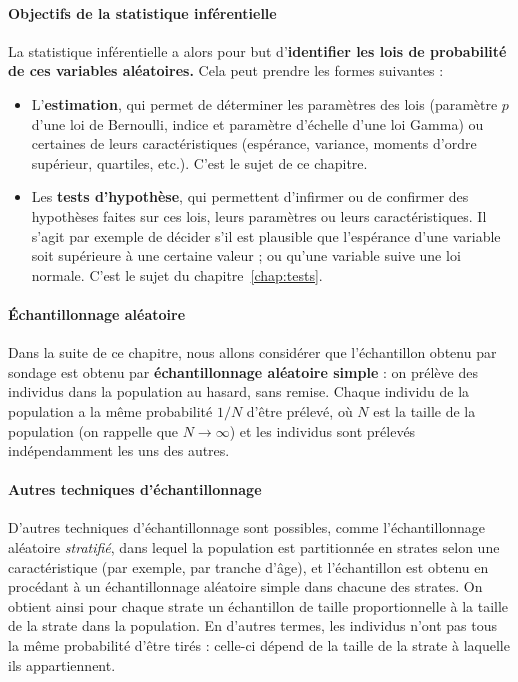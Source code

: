 \paragraph{Objectifs de la statistique inférentielle} La statistique
inférentielle a alors pour but d'\textbf{identifier les lois de probabilité de ces
  variables aléatoires.} Cela peut prendre les
formes suivantes :
\begin{itemize}
\item L'\textbf{estimation}, qui permet de déterminer les paramètres des lois (paramètre
  $p$ d'une loi de Bernoulli, indice et paramètre d'échelle d'une loi Gamma) ou
  certaines de leurs caractéristiques (espérance, variance, moments d'ordre
  supérieur, quartiles, etc.). C'est le sujet de ce chapitre.
\item Les \textbf{tests d'hypothèse}, qui permettent d'infirmer ou de confirmer des
  hypothèses faites sur ces lois, leurs paramètres ou leurs
  caractéristiques. Il s'agit par exemple de décider s'il est plausible que
  l'espérance d'une variable soit supérieure à une certaine valeur ; ou qu'une
  variable suive une loi normale. C'est le sujet du chapitre~\ref{chap:tests}. %
  
\end{itemize}

\paragraph{Échantillonnage aléatoire}
Dans la suite de ce chapitre, nous allons considérer que l'échantillon obtenu
par sondage est obtenu par \textbf{échantillonnage aléatoire simple} : on
prélève des individus dans la population au hasard, sans remise. Chaque
individu de la population a la même probabilité $1/N$ d'être prélevé, où $N$
est la taille de la population (on rappelle que $N \rightarrow \infty$) et les 
individus sont prélevés indépendamment les uns des autres.

\paragraph{Autres techniques d'échantillonnage} D'autres techniques
d'échantillonnage sont possibles, comme l'échantillonnage aléatoire
\textit{stratifié}, dans lequel la population est partitionnée en strates selon
une caractéristique (par exemple, par tranche d'âge), et l'échantillon est
obtenu en procédant à un échantillonnage aléatoire simple dans chacune des
strates. On obtient ainsi pour chaque strate un échantillon de taille
proportionnelle à la taille de la strate dans la population. En d'autres
termes, les individus n'ont pas tous la même probabilité d'être tirés :
celle-ci dépend de la taille de la strate à laquelle ils appartiennent.

